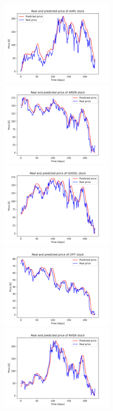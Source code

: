 \clearpage
\begin{figure}
\includegraphics[width=0.5\textwidth]{./graf/model1/AAPL.png}
\includegraphics[width=0.5\textwidth]{./graf/model1/AMZN.png}
\includegraphics[width=0.5\textwidth]{./graf/model1/GOOGL.png}
\includegraphics[width=0.5\textwidth]{./graf/model1/LYFT.png}
\includegraphics[width=0.5\textwidth]{./graf/model1/NVDA.png}

\end{figure}
